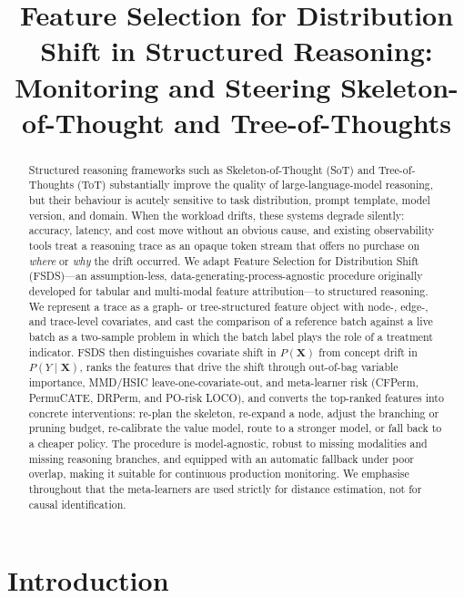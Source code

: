 \documentclass[11pt]{article}
\title{\bf Feature Selection for Distribution Shift in Structured Reasoning:\\
Monitoring and Steering Skeleton-of-Thought and Tree-of-Thoughts}
\author{}
\date{}
\newcommand{\X}{\mathbf{X}}
\begin{document}
\maketitle

\begin{abstract}
Structured reasoning frameworks such as Skeleton-of-Thought (SoT) and
Tree-of-Thoughts (ToT) substantially improve the quality of large-language-model
reasoning, but their behaviour is acutely sensitive to task distribution, prompt
template, model version, and domain. When the workload drifts, these systems
degrade silently: accuracy, latency, and cost move without an obvious cause, and
existing observability tools treat a reasoning trace as an opaque token stream
that offers no purchase on \emph{where} or \emph{why} the drift occurred. We
adapt Feature Selection for Distribution Shift (FSDS)---an assumption-less,
data-generating-process-agnostic procedure originally developed for tabular and
multi-modal feature attribution---to structured reasoning. We represent a trace
as a graph- or tree-structured feature object with node-, edge-, and
trace-level covariates, and cast the comparison of a reference batch against a
live batch as a two-sample problem in which the batch label plays the role of a
treatment indicator. FSDS then distinguishes covariate shift in $P(\X)$ from
concept drift in $P(Y\mid\X)$, ranks the features that drive the shift through
out-of-bag variable importance, MMD/HSIC leave-one-covariate-out, and
meta-learner risk (CFPerm, PermuCATE, DRPerm, and PO-risk LOCO), and converts
the top-ranked features into concrete interventions: re-plan the skeleton,
re-expand a node, adjust the branching or pruning budget, re-calibrate the value
model, route to a stronger model, or fall back to a cheaper policy. The
procedure is model-agnostic, robust to missing modalities and missing reasoning
branches, and equipped with an automatic fallback under poor overlap, making it
suitable for continuous production monitoring. We emphasise throughout that the
meta-learners are used strictly for distance estimation, not for causal
identification.
\end{abstract}

\section{Introduction}
\label{sec:intro}
\end{document}

